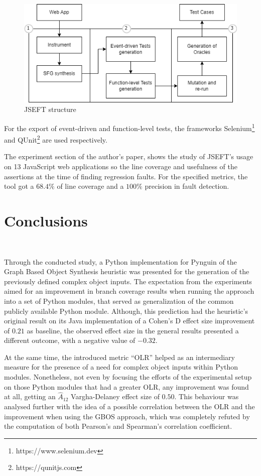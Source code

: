\documentclass[%
  chapterprefix=false,%
  open=right,%
  twoside=true,%
  paper=a4,%
  logofile={Figures/logo.png},%
  thesistype=master,%
  UKenglish,%
]{se2thesis}
\begin{document}
\begin{figure}[tb]
  \centering 
  \includegraphics[width=.99\textwidth]{Figures/jseft2.png}
  \caption{JSEFT structure}\label{fig:jseft}
\end{figure}

For the export of event-driven and function-level tests, the frameworks Selenium\footnote{https://www.selenium.dev} and QUnit\footnote{https://qunitjs.com} are used respectively.

The experiment section of the author's paper, shows the study of JSEFT's usage on 13 JavaScript web applications so the line coverage and usefulness of the assertions at the time of finding regression faults.
For the specified metrics, the tool got a \(68.4\%\) of line coverage and a \(100\%\) precision in fault detection.

\chapter{Conclusions}~\label{chap:conclusions}

Through the conducted study, a Python implementation for Pynguin of the Graph Based Object Synthesis heuristic was presented for the generation of the previously defined complex object inputs.
The expectation from the experiments aimed for an improvement in branch coverage results when running the approach into a set of Python modules, that served as generalization of the common publicly available Python module.
Although, this prediction had the heuristic's original result on its Java implementation of a Cohen's D effect size improvement of \(0.21\) as baseline, the observed effect size in the general results presented a different outcome, with a negative value of \(-0.32\).

At the same time, the introduced metric ``OLR'' helped as an intermediary measure for the presence of a need for complex object inputs within Python modules. 
Nonetheless, not even by focusing the efforts of the experimental setup on those Python modules that had a greater OLR, any improvement was found at all, getting an \(\hat{A}_{12}\) Vargha-Delaney effect size of \(0.50\).
This behaviour was analysed further with the idea of a possible correlation between the OLR and the improvement when using the GBOS approach, which was completely refuted by the computation of both Pearson's and Spearman's correlation coefficient.
\end{document}
